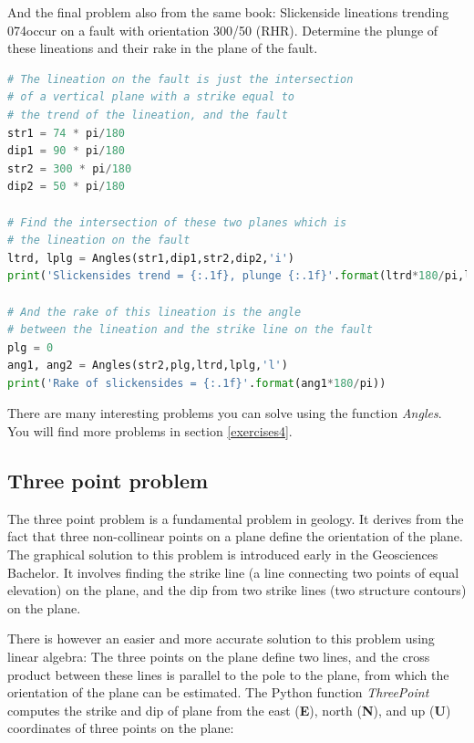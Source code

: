 \documentclass[a4paper , 12pt]{book}
\begin{document}
And the final problem also from the same book: Slickenside lineations trending 074\degree occur on a fault with orientation 300/50 (RHR). Determine the plunge of these lineations and their rake in the plane of the fault.

\begin{center}
\begin{lstlisting}[language=Python, frame=single]
# The lineation on the fault is just the intersection
# of a vertical plane with a strike equal to
# the trend of the lineation, and the fault
str1 = 74 * pi/180
dip1 = 90 * pi/180
str2 = 300 * pi/180
dip2 = 50 * pi/180

# Find the intersection of these two planes which is
# the lineation on the fault
ltrd, lplg = Angles(str1,dip1,str2,dip2,'i')
print('Slickensides trend = {:.1f}, plunge {:.1f}'.format(ltrd*180/pi,lplg*180/pi))

# And the rake of this lineation is the angle
# between the lineation and the strike line on the fault
plg = 0
ang1, ang2 = Angles(str2,plg,ltrd,lplg,'l')
print('Rake of slickensides = {:.1f}'.format(ang1*180/pi))
\end{lstlisting}
\end{center}

There are many interesting problems you can solve using the function \textit{Angles}. You will find more problems in section \ref{exercises4}.

\subsection{Three point problem}

The three point problem is a fundamental problem in geology. It derives from the fact that three non-collinear points on a plane define the orientation of the plane. The graphical solution to this problem is introduced early in the Geosciences Bachelor. It involves finding the strike line (a line connecting two points of equal elevation) on the plane, and the dip from two strike lines (two structure contours) on the plane. 

There is however an easier and more accurate solution to this problem using linear algebra: The three points on the plane define two lines, and the cross product between these lines is parallel to the pole to the plane, from which the orientation of the plane can be estimated. The Python function \textit{ThreePoint} computes the strike and dip of plane from the east (\textbf{E}), north (\textbf{N}), and up (\textbf{U}) coordinates of three points on the plane:
\end{document}
